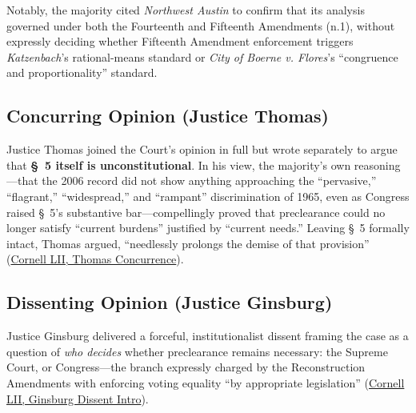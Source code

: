\documentclass[12pt]{article}
\begin{document}
Notably, the majority cited \emph{Northwest Austin} to confirm that its analysis governed under both the Fourteenth and Fifteenth Amendments (n.1), without expressly deciding whether Fifteenth Amendment enforcement triggers \emph{Katzenbach}'s rational-means standard or \emph{City of Boerne v. Flores}'s ``congruence and proportionality'' standard.

\subsection{Concurring Opinion (Justice Thomas)}

Justice Thomas joined the Court's opinion in full but wrote separately to argue that \textbf{\S~5 itself is unconstitutional}. In his view, the majority's own reasoning---that the 2006 record did not show anything approaching the ``pervasive,'' ``flagrant,'' ``widespread,'' and ``rampant'' discrimination of 1965, even as Congress raised \S~5's substantive bar---compellingly proved that preclearance could no longer satisfy ``current burdens'' justified by ``current needs.'' Leaving \S~5 formally intact, Thomas argued, ``needlessly prolongs the demise of that provision'' (\href{https://www.law.cornell.edu/supremecourt/text/12-96}{Cornell LII, Thomas Concurrence}).

\subsection{Dissenting Opinion (Justice Ginsburg)}

Justice Ginsburg delivered a forceful, institutionalist dissent framing the case as a question of \emph{who decides} whether preclearance remains necessary: the Supreme Court, or Congress---the branch expressly charged by the Reconstruction Amendments with enforcing voting equality ``by appropriate legislation'' (\href{https://www.law.cornell.edu/supremecourt/text/12-96}{Cornell LII, Ginsburg Dissent Intro}).
\end{document}
